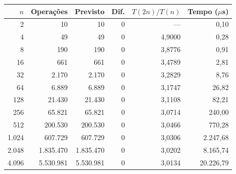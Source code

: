 \begin{tabular}{rrrrrr}
\toprule
$n$ & Operações & Previsto & Dif. & $T(2n)/T(n)$ & Tempo ($\mu$s) \\
\midrule
2 & 10 & 10 & 0 & --- & 0,10 \\
4 & 49 & 49 & 0 & 4,9000 & 0,28 \\
8 & 190 & 190 & 0 & 3,8776 & 0,91 \\
16 & 661 & 661 & 0 & 3,4789 & 2,81 \\
32 & 2.170 & 2.170 & 0 & 3,2829 & 8,76 \\
64 & 6.889 & 6.889 & 0 & 3,1747 & 26,82 \\
128 & 21.430 & 21.430 & 0 & 3,1108 & 82,21 \\
256 & 65.821 & 65.821 & 0 & 3,0714 & 240,00 \\
512 & 200.530 & 200.530 & 0 & 3,0466 & 770,28 \\
1.024 & 607.729 & 607.729 & 0 & 3,0306 & 2.247,68 \\
2.048 & 1.835.470 & 1.835.470 & 0 & 3,0202 & 8.165,74 \\
4.096 & 5.530.981 & 5.530.981 & 0 & 3,0134 & 20.226,79 \\
\bottomrule
\end{tabular}
